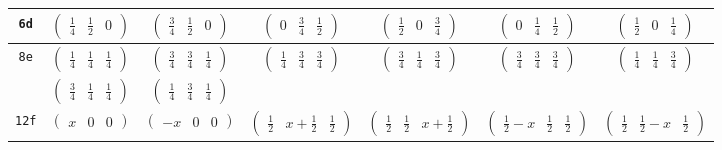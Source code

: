 \documentclass[fleqn,9pt,landscape]{jsarticle}
\begin{document}
\begin{center}
\begin{longtable}{ccccccc}
{\tt 6d} & $ \begin{pmatrix} \frac{1}{4} & \frac{1}{2} & 0 \end{pmatrix} $ & $ \begin{pmatrix} \frac{3}{4} & \frac{1}{2} & 0 \end{pmatrix} $ & $ \begin{pmatrix} 0 & \frac{3}{4} & \frac{1}{2} \end{pmatrix} $ & $ \begin{pmatrix} \frac{1}{2} & 0 & \frac{3}{4} \end{pmatrix} $ & $ \begin{pmatrix} 0 & \frac{1}{4} & \frac{1}{2} \end{pmatrix} $ & $ \begin{pmatrix} \frac{1}{2} & 0 & \frac{1}{4} \end{pmatrix} $ \\ \hline
{\tt 8e} & $ \begin{pmatrix} \frac{1}{4} & \frac{1}{4} & \frac{1}{4} \end{pmatrix} $ & $ \begin{pmatrix} \frac{3}{4} & \frac{3}{4} & \frac{1}{4} \end{pmatrix} $ & $ \begin{pmatrix} \frac{1}{4} & \frac{3}{4} & \frac{3}{4} \end{pmatrix} $ & $ \begin{pmatrix} \frac{3}{4} & \frac{1}{4} & \frac{3}{4} \end{pmatrix} $ & $ \begin{pmatrix} \frac{3}{4} & \frac{3}{4} & \frac{3}{4} \end{pmatrix} $ & $ \begin{pmatrix} \frac{1}{4} & \frac{1}{4} & \frac{3}{4} \end{pmatrix} $ \\
& $ \begin{pmatrix} \frac{3}{4} & \frac{1}{4} & \frac{1}{4} \end{pmatrix} $ & $ \begin{pmatrix} \frac{1}{4} & \frac{3}{4} & \frac{1}{4} \end{pmatrix} $ & $  $ & $  $ & $  $ & $  $ \\ \hline
{\tt 12f} & $ \begin{pmatrix} x & 0 & 0 \end{pmatrix} $ & $ \begin{pmatrix} - x & 0 & 0 \end{pmatrix} $ & $ \begin{pmatrix} \frac{1}{2} & x + \frac{1}{2} & \frac{1}{2} \end{pmatrix} $ & $ \begin{pmatrix} \frac{1}{2} & \frac{1}{2} & x + \frac{1}{2} \end{pmatrix} $ & $ \begin{pmatrix} \frac{1}{2} - x & \frac{1}{2} & \frac{1}{2} \end{pmatrix} $ & $ \begin{pmatrix} \frac{1}{2} & \frac{1}{2} - x & \frac{1}{2} \end{pmatrix} $ \\

\end{longtable}
\end{center}
\end{document}
